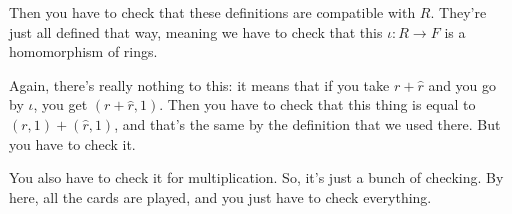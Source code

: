\begin{speech}[01:05:45 - 01:07:25]
Then you have to check that these definitions are compatible with $R$. They're just all defined that way, meaning we have to check  that this $\iota \colon R \to F$ is a homomorphism of rings.

Again, there's really nothing to this: it means that if you take $r + \hat{r}$  and you go by $\iota$, you get $(r + \hat{r}, 1)$. Then you have to check that this thing is equal to $(r, 1) + (\hat{r}, 1)$,  and that's the same by the definition that we used there. But you have to check it.

You also have to check it for multiplication. So, it's just a bunch of checking. By here, all the cards are played, and you just have to check everything.
\end{speech}

